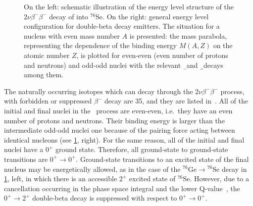 \begin{figure}
  \centering
  \caption{%
    On the left: schematic illustration of the energy level structure of the
    $2\nu\beta^-\beta^-$ decay of \gesix into $^{76}$Se. On the right: general
    energy level configuration for double-beta decay emitters.  The situation
    for a nucleus with even mass number $A$ is presented: the mass parabola,
    representing the dependence of the binding energy $M(A,Z)$ on the atomic
    number $Z$, is plotted for even-even (even number of protons and neutrons)
    and odd-odd nuclei with the relevant \b\ and \b\b\ decays among them.
  }\label{fig:nbb:gesixlevels}
\end{figure}

\marginnote{$2\nu\beta^-\beta^-$}
The naturally occurring isotopes which can decay through the
$2\nu\beta^-\beta^-$ process, with forbidden or suppressed $\beta^-$ decay are
35, and they are listed in~\cite{Giunti2007}. All of the initial and final
nuclei in the \nnbbm\ process are even-even, i.e.~they have an
even number of protons and neutrons. Their binding energy is larger than the
intermediate odd-odd nuclei one because of the pairing force acting between
identical nucleons (see \cref{fig:nbb:gesixlevels}, right). For the same reason,
all of the initial and final nuclei have a $0^+$ ground state.  Therefore, all
ground-state to ground-state transitions are $0^+\rightarrow0^+$. Ground-state
transitions to an excited state of the final nucleus may be energetically
allowed, as in the case of the $^{76}\text{Ge} \rightarrow {^{76}\text{Se}}$ decay in
\cref{fig:nbb:gesixlevels}, left, in which there is an accessible $2^+$ excited
state of $^{76}$Se. However, due to a cancellation occurring in the phase
space integral and the lower Q-value~\cite{Tomoda1991}, the
$0^+\rightarrow2^+$ double-beta decay is suppressed with respect to
$0^+\rightarrow0^+$.

